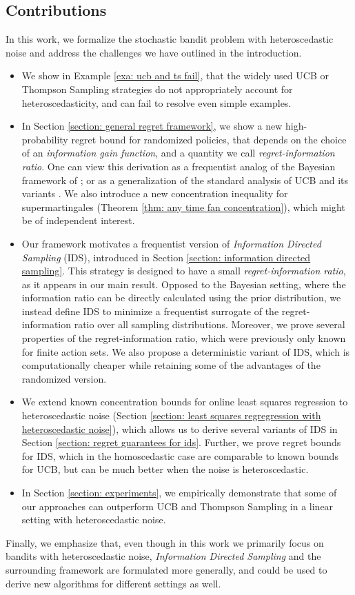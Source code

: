 \subsection{Contributions}
 In this work, we formalize the stochastic bandit problem with heteroscedastic noise and address the challenges we have outlined in the introduction.
\begin{itemize}
	\item We show in Example \ref{exa: ucb and ts fail}, that the widely used UCB or Thompson Sampling strategies do not appropriately account for heteroscedasticity, and can fail to resolve even simple examples. 
	\item In Section \ref{section: general regret framework}, we show a new high-probability regret bound for randomized policies, that depends on the choice of an \emph{information gain function}, and a quantity we call \emph{regret-information ratio}. One can view this derivation as a frequentist analog of the Bayesian framework of \cite{RussoLearningOptimizeInformationDirected2014}; or as a generalization of the standard analysis of UCB and its variants \cite[]{Abbasi-YadkoriImprovedAlgorithmsLinear2011, SrinivasGaussianProcessOptimization2010}. We also introduce a new concentration inequality for supermartingales (Theorem \ref{thm: any time fan concentration}), which might be of independent interest. 
	\item Our framework motivates a frequentist version of \emph{Information Directed Sampling} (IDS), introduced in Section \ref{section: information directed sampling}. This strategy is designed to have a small \emph{regret-information ratio}, as it appears in our main result. Opposed to the Bayesian setting, where the information ratio can be directly calculated using the prior distribution, we instead define IDS to minimize a frequentist surrogate of the regret-information ratio over all sampling distributions. Moreover, we prove several properties of the regret-information ratio, which were previously only known for finite action sets. We also propose a deterministic variant of IDS, which is computationally cheaper while retaining some of the advantages of the randomized version.
	\item We extend known concentration bounds for online least squares regression \citep{Abbasi-YadkoriOnlinelearninglinearly2012} to heteroscedastic noise (Section \ref{section: least squares regregression with heteroscedastic noise}), which allows us to derive several variants of IDS in Section \ref{section: regret guarantees for ids}. Further, we prove regret bounds for IDS, which in the homoscedastic case are comparable to known bounds for UCB, but can be much better when the noise is heteroscedastic.
\item In Section \ref{section: experiments}, we empirically demonstrate that some of our approaches can outperform UCB and Thompson Sampling in a linear setting with heteroscedastic noise.
\end{itemize}
Finally, we emphasize that, even though in this work we primarily focus on bandits with heteroscedastic noise, \emph{Information Directed Sampling} and the surrounding framework are formulated more generally, and could be used to derive new algorithms for different settings as well.

